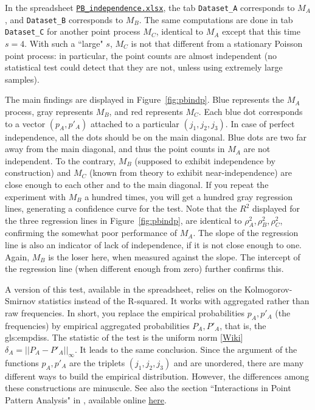\documentclass[10pt]{article}
\begin{document}
\noindent In the spreadsheet \href{https://github.com/VincentGranville/Point-Processes/tree/main/Spreadsheets}{\texttt{PB\_independence.xlsx}}, 
the tab \texttt{Dataset\_A} corresponds to $M_A$, and \texttt{Dataset\_B} corresponds to $M_B$. The same computations are done in
tab \texttt{Dataset\_C} for another point process $M_C$, identical to $M_A$ except that this time $s=4$. With such a ``large" $s$, $M_C$ is not that different
from a stationary Poisson point process: in particular, the point counts are almost independent (no statistical test could detect that they are not, unless using extremely large samples). 

The main findings are displayed in Figure~\ref{fig:pbindp}.  Blue represents the $M_A$ process, gray represents $M_B$, and red represents $M_C$. Each blue dot
corresponds to a vector $(p_A, p'_A)$ attached to a particular $(j_1,j_2,j_3)$. In case of perfect independence, all the dots should be on the main diagonal. Blue dots
are two far away from the main diagonal, and thus the point counts in $M_A$ are not independent. To the contrary, $M_B$ (supposed to exhibit independence by construction) and $M_C$ 
(known from theory to exhibit near-independence) are close enough to each other and to the main diagonal. If you repeat the experiment with $M_B$ a hundred times, you will get a hundred
gray regression lines, generating a confidence curve for the test. Note that the $R^2$ displayed for the three regression lines in Figure~\ref{fig:pbindp}, are identical to
$\rho_A^2, \rho_B^2,\rho_C^2$, confirming the somewhat poor performance of $M_A$. The slope of the regression line is also an indicator of lack of independence, if it is not close
enough to one. Again, $M_B$ is the loser here, when measured against the slope. The intercept of the regression line (when different enough from zero) further confirms this.

A version of this test, available in the spreadsheet, relies on the Kolmogorov-Smirnov statistics instead of the R-squared. It works with aggregated rather than raw frequencies. In short, 
you replace the empirical probabilities $p_A,p'_A$ (the frequencies) by empirical aggregated probabilities $P_A,P'_A$, that is,
 the  \glspl{gls:empdis}. The statistic of the test is the uniform norm 
[\href{https://en.wikipedia.org/wiki/Uniform_norm}{Wiki}] $\delta_A=||P_A-P'_A||_\infty$. It leads to the same conclusion. Since the argument of the functions $p_A,p'_A$ are the triplets $(j_1,j_2,j_3)$
and are unordered, there are many different ways to build the empirical distribution. However, the differences among these constructions are minuscule. See also the section
``Interactions in Point Pattern Analysis" in \cite{ppindep}, available online \href{https://www.geo.fu-berlin.de/en/v/soga/Geodata-analysis/Spatial-Point-patterns/Analysis-of-spatial-point-patterns/Interactions/index.html}{here}.\\
\end{document}
